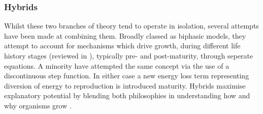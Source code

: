 \documentclass[a4paper]{article} %
\begin{document}
        \subsubsection{Hybrids}\label{hybrids}
        Whilst these two branches of theory tend to operate in isolation, several attempts have been made at combining them. Broadly classed as biphasic models, they attempt to account for mechanisms which drive growth, during different life history stages (reviewed in \autocite{Wilson2018}), typically pre- and post-maturity, through seperate equations. A minority have attempted the same concept via the use of a discontinuous step function. In either case a new energy loss term representing diversion of energy to reproduction is introduced maturity. Hybrids maximise explanatory potential by blending both philosophies in understanding how and why organisms grow \autocite{Marshall2019b}.
\end{document}
